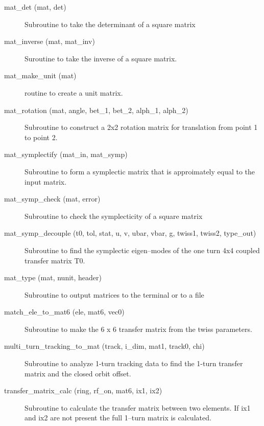 \begin{description}
\item[mat\_det (mat, det)] \Newline 
     Subroutine to take the determinant of a square matrix

\item[mat\_inverse (mat, mat\_inv)] \Newline
Suroutine to take the inverse of a square matrix. 

\item[mat\_make\_unit (mat)] \Newline 
     routine to create a unit matrix.

\item[mat\_rotation (mat, angle, bet\_1, bet\_2, alph\_1, alph\_2)] \Newline 
     Subroutine to construct a 2x2 rotation matrix for translation from
     point 1 to point 2.

\item[mat\_symplectify (mat\_in, mat\_symp)] \Newline
Subroutine to form a symplectic matrix that is approimately equal to the input matrix. 

\item[mat\_symp\_check (mat, error)] \Newline
Subroutine to check the symplecticity of a square matrix 

\item[mat\_symp\_decouple (t0, tol, stat, u, v, ubar, vbar, g, twiss1, twiss2, type\_out)] \Newline
Subroutine to find the symplectic eigen--modes of the one turn 4x4 coupled 
transfer matrix T0. 

\item[mat\_type (mat, nunit, header)] \Newline 
     Subroutine to output matrices to the terminal or to a file

\item[match\_ele\_to\_mat6 (ele, mat6, vec0)] \Newline 
Subroutine to make the 6 x 6 transfer matrix from the twiss parameters.

\item[multi\_turn\_tracking\_to\_mat (track, i\_dim, mat1, track0, chi)] \Newline
Subroutine to analyze 1-turn tracking data to find the 1-turn transfer matrix 
and the closed orbit offset.

\item[transfer\_matrix\_calc (ring, rf\_on, mat6, ix1, ix2)] \Newline
Subroutine to calculate the transfer matrix between two elements. If
ix1 and ix2 are not present the full 1--turn matrix is calculated.


\end{description}
